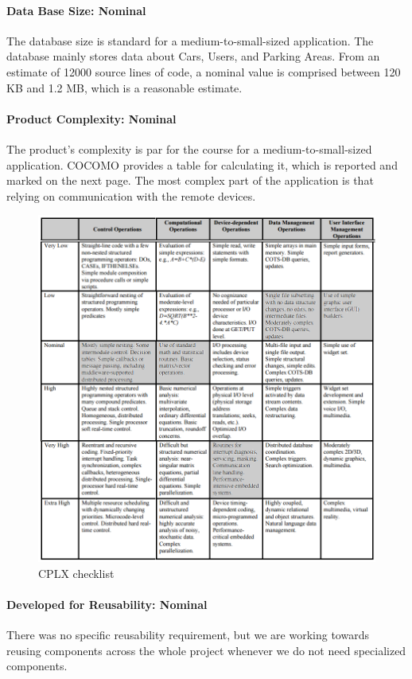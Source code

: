 \paragraph*{Data Base Size: Nominal}
The database size is standard for a medium-to-small-sized application. The database mainly stores data about Cars, Users, and Parking Areas. From an estimate of 12000 source lines of code, a nominal value is comprised between 120 KB and 1.2 MB, which is a reasonable estimate.

\paragraph*{Product Complexity: Nominal}
The product's complexity is par for the course for a medium-to-small-sized application. COCOMO provides a table for calculating it, which is reported and marked on the next page. The most complex part of the application is that relying on communication with the remote devices.

\begin{figure}[h!]
	\centering
	\includegraphics[width=\textwidth]{Images/CPLX}
	\caption{CPLX checklist}
\end{figure}


\paragraph*{Developed for Reusability: Nominal}
There was no specific reusability requirement, but we are working towards reusing components across the whole project whenever we do not need specialized components.

